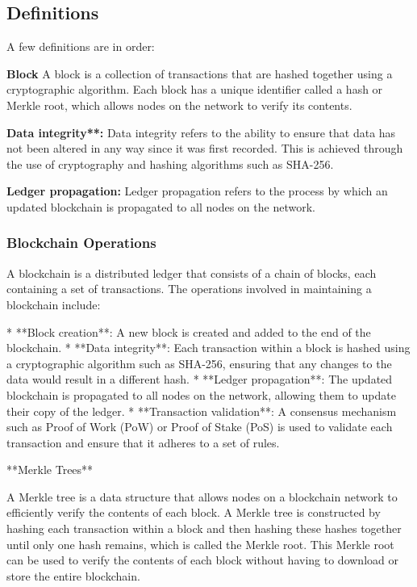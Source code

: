 \begin{documen}
\subsection{Definitions}

A few definitions are in order:

\textbf{Block} A block is a collection of transactions that are hashed together using a cryptographic algorithm. Each block has a unique identifier called a hash or Merkle root, which allows nodes on the network to verify its contents.

\textbf{Data integrity**:} Data integrity refers to the ability to ensure that data has not been altered in any way since it was first recorded. This is achieved through the use of cryptography and hashing algorithms such as SHA-256.

\textbf{Ledger propagation:} Ledger propagation refers to the process by which an updated blockchain is propagated to all nodes on the network.

\subsubsection{Blockchain Operations}

A blockchain is a distributed ledger that consists of a chain of blocks, each containing a set of transactions. The operations involved in maintaining a blockchain include:

* **Block creation**: A new block is created and added to the end of the blockchain.
* **Data integrity**: Each transaction within a block is hashed using a cryptographic algorithm such as SHA-256, ensuring that any changes to the data would result in a different hash.
* **Ledger propagation**: The updated blockchain is propagated to all nodes on the network, allowing them to update their copy of the ledger.
* **Transaction validation**: A consensus mechanism such as Proof of Work (PoW) or Proof of Stake (PoS) is used to validate each transaction and ensure that it adheres to a set of rules.


**Merkle Trees**

A Merkle tree is a data structure that allows nodes on a blockchain network to efficiently verify the contents of each block. A Merkle tree is constructed by hashing each transaction within a block and then hashing these hashes together until only one hash remains, which is called the Merkle root. This Merkle root can be used to verify the contents of each block without having to download or store the entire blockchain.


\end{documen}
